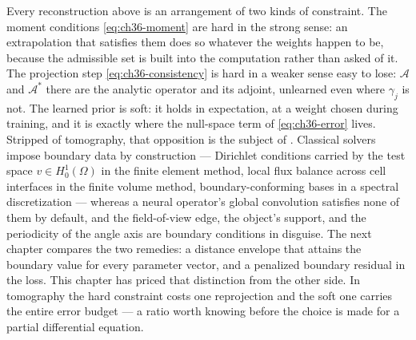 \medskip
Every reconstruction above is an arrangement of two kinds of constraint. The
moment conditions \eqref{eq:ch36-moment} are hard in the strong sense: an
extrapolation that satisfies them does so whatever the weights happen to be,
because the admissible set is built into the computation rather than asked of
it. The projection step \eqref{eq:ch36-consistency} is hard in a weaker sense
easy to lose: $\mathcal{A}$ and $\mathcal{A}^*$ there are the analytic
operator and its adjoint, unlearned even where $\gamma_j$ is not.
The learned prior is soft: it holds in expectation, at a weight
chosen during training, and it is exactly where the null-space term of
\eqref{eq:ch36-error} lives. Stripped of tomography, that opposition is the
subject of .
Classical solvers impose boundary data by construction --- Dirichlet conditions
carried by the test space $v \in H^1_0(\Omega)$ in the finite element method,
local flux balance across cell interfaces in the finite volume method,
boundary-conforming bases in a spectral discretization
--- whereas a neural operator's global convolution satisfies none of them by
default, and the field-of-view edge, the object's support, and the periodicity of
the angle axis are boundary conditions in disguise. The next chapter compares
the two remedies: a distance envelope that attains the
boundary value for every parameter vector, and a penalized boundary residual in
the loss. This chapter has priced that distinction from the other side. In
tomography the hard constraint costs one reprojection and the soft one carries
the entire error budget --- a ratio worth knowing before the choice is made for
a partial differential equation.
